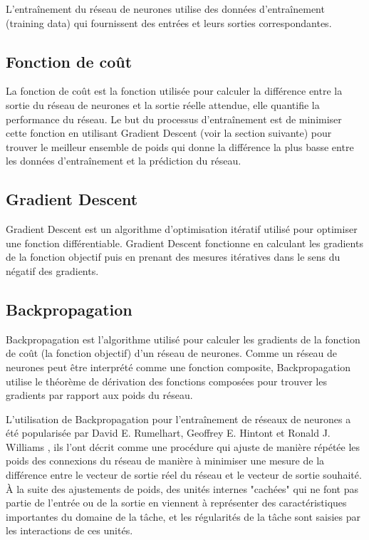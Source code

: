 L'entraînement du réseau de neurones utilise des données d'entraînement (training data) qui fournissent des entrées et leurs sorties correspondantes.

\subsection{Fonction de coût}
La fonction de coût est la fonction utilisée pour calculer la différence entre la sortie du réseau de neurones et la sortie réelle attendue, elle quantifie la performance du réseau. Le but du processus d'entraînement est de minimiser cette fonction en utilisant Gradient Descent (voir la section suivante) pour trouver le meilleur ensemble de poids qui donne la différence la plus basse entre les données d'entraînement et la prédiction du réseau.

\subsection{Gradient Descent}
Gradient Descent est un algorithme d'optimisation itératif utilisé pour optimiser une fonction différentiable. Gradient Descent fonctionne en calculant les gradients de la fonction objectif puis en prenant des mesures itératives dans le sens du négatif des gradients.

\subsection{Backpropagation}
Backpropagation est l'algorithme utilisé pour calculer les gradients de la fonction de coût (la fonction objectif) d'un réseau de neurones. Comme un réseau de neurones peut être interprété comme une fonction composite, Backpropagation utilise le théorème de dérivation des fonctions composées
pour trouver les gradients par rapport aux poids du réseau.

L'utilisation de Backpropagation pour l'entraînement de réseaux de neurones a été popularisée par David E. Rumelhart, Geoffrey E. Hintont et Ronald J. Williams \cite{Rumelhart1986}, ils l'ont décrit comme une procédure qui ajuste de manière répétée les poids des connexions du réseau de manière à minimiser une mesure de la différence entre le vecteur de sortie réel du réseau et le vecteur de sortie souhaité. À la suite des ajustements de poids, des unités internes "cachées" qui ne font pas partie de l'entrée ou de la sortie en viennent à représenter des caractéristiques importantes du domaine de la tâche, et les régularités de la tâche sont saisies par les interactions de ces unités.

